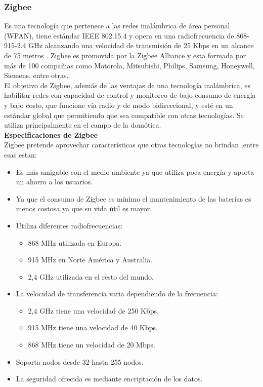\documentclass[11pt,openany]{book}
\newcounter{ns}
\begin{document}
	\subsubsection{Zigbee}

	Es una tecnología que pertenece a las redes inalámbrica de área personal (WPAN), tiene estándar IEEE 802.15.4 y opera en una radiofrecuencia de 868-915-2.4 GHz alcanzando una velocidad de transmisión de 25 Kbps en un alcance de 75 metros \cite{Cherrez2010,Chavarria2011,Carignano2011}. Zigbee es promovida por la Zigbee Alliance \cite{Zigbee} y esta formada por más de 100 compañias como Motorola, Mitsubishi, Philips, Samsung, Honeywell, Siemens, entre otras. \\
	El objetivo de Zigbee, además de las ventajas de una tecnología inalámbrica, es habilitar redes con capacidad de control y monitoreo de bajo consumo de energía y bajo costo, que funcione vía radio y de modo bidireccional, y esté en un estándar global que permitiendo que sea compatible con otras tecnologías. Se utiliza principalmente en el campo de la domótica.\\[0.25cm]
	\textbf{Especificaciones de Zigbee}\\[0.25cm]
	Zigbee pretende aprovechar características que otras tecnologías no brindan ,entre esas estan:
	\begin{itemize}
		\item Es más amigable con el medio ambiente ya que utiliza poca energía y aporta un ahorro a los usuarios.
		\item Ya que el consumo de Zigbee es mínimo el mantenimiento de las baterías es menos costosa ya que su vida útil es mayor.
		\item Utiliza diferentes radiofrecuencias:
		\begin{itemize}
			\item 868 MHz utilizada en Europa.
			\item 915 MHz en Norte América y Australia.
			\item 2,4 GHz utilizada en el resto del mundo.
		\end{itemize}
		\item La velocidad de transferencia varia dependiendo de la frecuencia:
		\begin{itemize}
			\item 2,4 GHz tiene una velocidad de 250 Kbps.
			\item 915 MHz tiene una velocidad de 40 Kbps.
			\item 868 MHz tiene un velocidad de 20 Mbps.
		\end{itemize}
		\item Soporta nodos desde 32 hasta 255 nodos.
		\item La seguridad ofrecida es mediante encriptación de los datos.
	\end{itemize}
	\newpage
\end{document}
